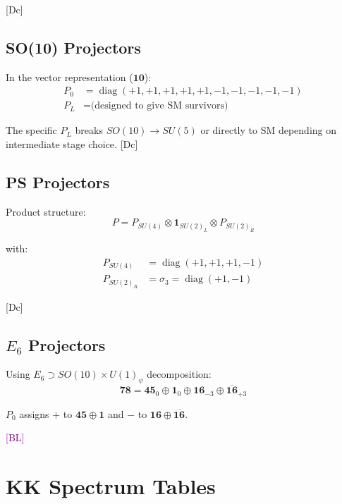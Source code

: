 \documentclass[11pt,a4paper]{article}
\newcommand{\tagDc}{\textcolor{blue!50!black}{[Dc]}}
\newcommand{\tagBL}{\textcolor{purple}{[BL]}}
\DeclareMathOperator{\diag}{diag}
\begin{document}
\tagDc

\subsection{SO(10) Projectors}

In the vector representation ($\mathbf{10}$):
\begin{align}
\label{eq:app-so10-P0}
P_0 &= \diag(+1, +1, +1, +1, +1, -1, -1, -1, -1, -1) \\
\label{eq:app-so10-PL}
P_L &= \text{(designed to give SM survivors)}
\end{align}

The specific $P_L$ breaks $SO(10) \to SU(5)$ or directly to SM depending on
intermediate stage choice. \tagDc

\subsection{PS Projectors}

Product structure:
\begin{equation}
\label{eq:app-ps-P}
P = P_{SU(4)} \otimes \mathbf{1}_{SU(2)_L} \otimes P_{SU(2)_R}
\end{equation}

with:
\begin{align}
\label{eq:app-ps-su4}
P_{SU(4)} &= \diag(+1, +1, +1, -1) \\
\label{eq:app-ps-su2r}
P_{SU(2)_R} &= \sigma_3 = \diag(+1, -1)
\end{align}

\tagDc

\subsection{$E_6$ Projectors}

Using $E_6 \supset SO(10) \times U(1)_\psi$ decomposition:
\begin{equation}
\label{eq:app-e6-decomp}
\mathbf{78} = \mathbf{45}_0 \oplus \mathbf{1}_0 \oplus \mathbf{16}_{-3} \oplus \overline{\mathbf{16}}_{+3}
\end{equation}

$P_0$ assigns $+$ to $\mathbf{45} \oplus \mathbf{1}$ and $-$ to $\mathbf{16} \oplus \overline{\mathbf{16}}$.

\tagBL

\section{KK Spectrum Tables}
\label{app:spectrum}
\end{document}
